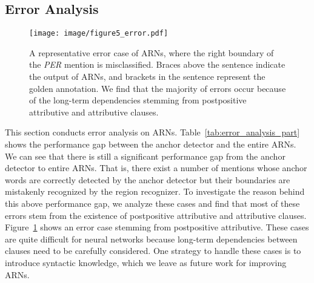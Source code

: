 \documentclass[11pt,a4paper]{article}
\begin{document}
\subsection{Error Analysis}


\begin{table}
\begin{center}
\end{center}
\caption{F1-scores gap between the anchor detector and the entire ARNs (anchor + region). }\label{tab:error_analysis_part}
\end{table}

\begin{figure}
\setlength{\belowcaptionskip}{-0.4cm}
  \centering
  \texttt{[image: image/figure5\_error.pdf]}\\
  \caption{A representative error case of ARNs, where the right boundary of the \emph{PER} mention is misclassified. Braces above the sentence indicate the output of ARNs, and brackets in the sentence represent the golden annotation. We find that the majority of errors occur because of the long-term dependencies stemming from postpositive attributive and attributive clauses.}
  \label{fig:err_case}
\end{figure}



This section conducts error analysis on ARNs. Table~\ref{tab:error_analysis_part} shows the performance gap between the anchor detector and the entire ARNs. We can see that there is still a significant performance gap from the anchor detector to entire ARNs. That is, there exist a number of mentions whose anchor words are correctly detected by the anchor detector but their boundaries are mistakenly recognized by the region recognizer. To investigate the reason behind this above performance gap, we analyze these cases and find that most of these errors stem from the existence of postpositive attributive and attributive clauses. Figure~\ref{fig:err_case} shows an error case stemming from postpositive attributive. These cases are quite difficult for neural networks because long-term dependencies between clauses need to be carefully considered. One strategy to handle these cases is to introduce syntactic knowledge, which we leave as future work for improving ARNs.
\end{document}
